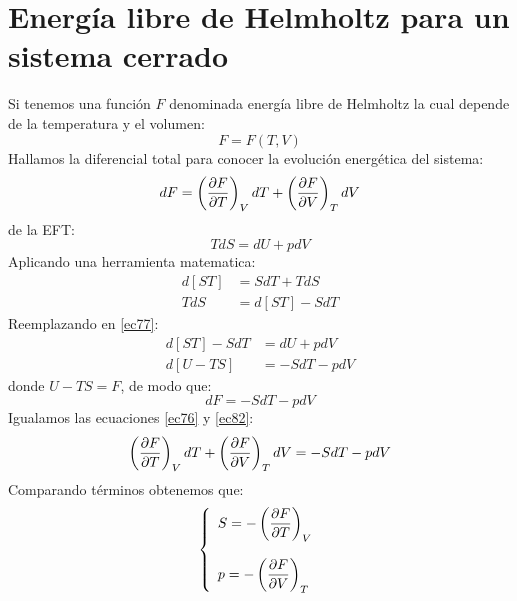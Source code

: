 \documentclass[../main]{subfiles}
\begin{document}
\section{Energía libre de Helmholtz para un sistema cerrado}
Si tenemos una función $F$ denominada energía libre de Helmholtz la cual depende de la temperatura y el volumen:
\begin{equation}
    F=F(T,V)
\end{equation}
Hallamos la diferencial total para conocer la evolución energética del sistema:
\begin{equation}
    dF=\left( \pdv{F}{T}\right)_V dT+\left( \pdv{F}{V} \right)_T dV
    \label{ec76}
\end{equation}
de la EFT:
\begin{equation}
    TdS=dU+pdV
    \label{ec77}
\end{equation}
Aplicando una herramienta matematica:
\begin{align}
    d[ST]&=SdT+TdS \\
    TdS&=d[ST]-SdT
\end{align}
Reemplazando en \eqref{ec77}:
\begin{align}
    d[ST]-SdT&=dU+pdV \\
    d[U-TS]&=-SdT-pdV
\end{align}
donde $U-TS=F$, de modo que:
\begin{equation}
    dF=-SdT-pdV
    \label{ec82}
\end{equation}
Igualamos las ecuaciones \eqref{ec76} y \eqref{ec82}:
\begin{align}
    \left( \pdv{F}{T}\right)_V dT+\left( \pdv{F}{V} \right)_T dV=-SdT-pdV
\end{align}
Comparando términos obtenemos que:
\begin{equation}
    \left\{ 
    \begin{array}{l}
         S=-\left(\displaystyle \pdv{F}{T}\right)_V \\ \\
         p=-\left(\displaystyle \pdv{F}{V}\right)_T
    \end{array} 
    \right. 
\end{equation}
\end{document}
